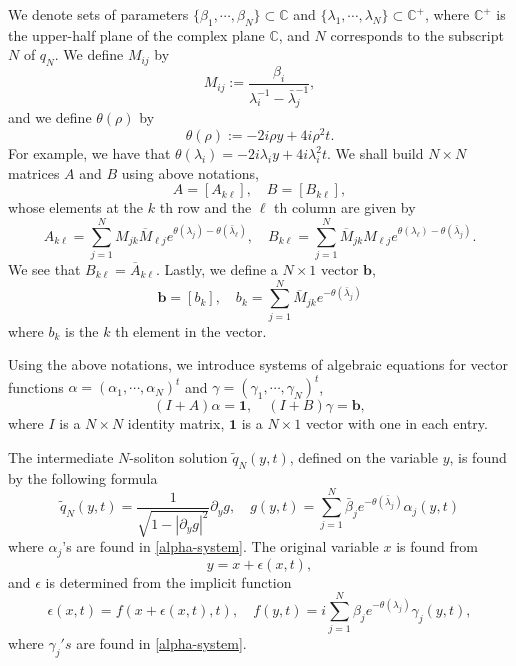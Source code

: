 \documentclass[11pt]{article}
\newcommand{\CC}{{\mathbb C}}
\begin{document}
We denote sets of parameters $\{\beta_1, \cdots, \beta_N\} \subset \CC$ and $\{\lambda_1,\cdots, \lambda_N\} \subset \CC^+$, where $\CC^+$ is the upper-half plane of the complex plane $\CC$, and $N$ corresponds to the subscript $N$ of $q_N$. We define $M_{ij}$ by
$$M_{ij}:=\frac{\beta_i}{\lambda_i^{-1}-\bar{\lambda}_j^{-1}},$$
and we define $\theta(\rho)$ by
$$\theta(\rho):=-2i\rho y+4i\rho^2 t.$$
For example, we have that $\theta(\lambda_i)=-2i\lambda_i y+4i\lambda_i^2 t$. We shall build $N \times N$ matrices $A$ and $B$ using above notations,
\begin{equation} \label{A-B}
A=[A_{k \ell}], \quad B=[B_{k \ell}],
\end{equation}
whose elements at the $k$ th row and the $\ell$ th column are given by
$$A_{k\ell}=\sum_{j=1}^NM_{jk}\overline{M}_{\ell j}e^{\theta(\lambda_j)-\theta(\bar{\lambda}_{\ell})},  \quad B_{k\ell}=\sum_{j=1}^N\overline{M}_{jk}M_{\ell j}e^{\theta(\lambda_{\ell})-\theta(\bar{\lambda}_{j})}.$$ 
We see that $B_{k\ell}=\overline{A}_{k\ell}$. Lastly, we define a $N\times 1$ vector $\mathbf{b}$,
\begin{equation} \label{b}
\mathbf{b}=[b_k], \quad b_k=\sum_{j=1}^N\overline{M}_{jk}e^{-\theta(\bar{\lambda}_{j})}
\end{equation}
where $b_k$ is the $k$ th element in the vector.

 Using the above notations, we introduce systems of algebraic equations for vector functions $\alpha=(\alpha_1,\cdots,\alpha_N)^t$ and $\gamma=(\gamma_1,\cdots,\gamma_N)^t$,
\begin{equation} \label{alpha-system}
(I+A)\alpha = \mathbf{1}, \quad (I+B)\gamma=\mathbf{b},
\end{equation}
where $I$ is a $N\times N$ identity matrix, $\mathbf{1}$ is a $N\times 1$ vector with one in each entry.  

The intermediate $N$-soliton solution $\tilde{q}_{N}(y,t)$, defined on the variable $y$, is found by the following formula
\begin{equation} \label{N-soliton-y}
\tilde{q}_{N}(y,t)=\frac{1}{\sqrt{1-|\partial_yg|^2}}\partial_yg, \quad g(y,t)=\sum_{j=1}^N\bar{\beta}_j e^{-\theta(\bar{\lambda}_j)}\alpha_j(y,t)
\end{equation}
where $\alpha_j$'s are found in \eqref{alpha-system}. The original variable $x$ is found from
\begin{equation} \label{x-equation}
y=x+\epsilon(x,t),
\end{equation}
and $\epsilon$ is determined from the implicit function
\begin{equation} \label{eps}
\epsilon(x,t)=f(x+\epsilon(x,t),t), \quad f(y,t)= i\sum_{j=1}^N\beta_j e^{-\theta(\lambda_j)}\gamma_j(y,t),
\end{equation}
where $\gamma_j's$ are found in \eqref{alpha-system}.
\end{document}
